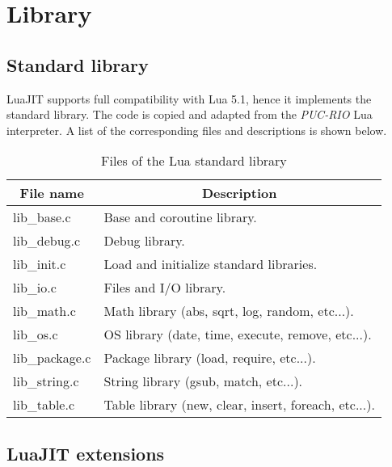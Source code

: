 \section{Library}

\subsection{Standard library}
\label{Subsec:std-lib}

LuaJIT supports full compatibility with Lua 5.1, hence it
implements the standard library. The code is copied and adapted from the
\emph{PUC-RIO} Lua interpreter. A list of the corresponding files and
descriptions is shown below.

\begin{table}[H]
\centering
\caption{Files of the Lua standard library}
\label{tab:library-std-files}
\begin{tabular}{|l|l|}
\hline
\multicolumn{1}{|c|}{File name} & \multicolumn{1}{c|}{Description}                     \\ \hline
lib\_base.c                     & Base and coroutine library.                          \\
lib\_debug.c                    & Debug library.                                       \\
lib\_init.c                     & Load and initialize standard libraries.              \\
lib\_io.c                       & Files and I/O library.                               \\
lib\_math.c                     & Math library (abs, sqrt, log, random, etc...).       \\
lib\_os.c                       & OS library (date, time, execute, remove, etc...).    \\
lib\_package.c                  & Package library (load, require, etc...).             \\
lib\_string.c                   & String library (gsub, match, etc...).                \\
lib\_table.c                    & Table library (new, clear, insert, foreach, etc...). \\ \hline
\end{tabular}
\end{table}


\subsection{LuaJIT extensions}
\label{Subsec:lj-extensions}

